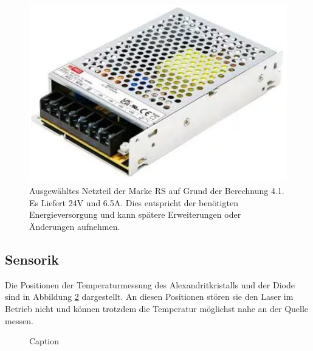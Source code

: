 \begin{figure}[H]
    \centering
    \includegraphics[scale=0.7]{98_images/controller_ps.PNG}
    \caption{Ausgewähltes Netzteil der Marke RS auf Grund der Berechnung 4.1. Es Liefert 24V und 6.5A. Dies entspricht der benötigten Energieversorgung und kann spätere Erweiterungen oder Änderungen aufnehmen.}
    \label{fig:controller_ps_hw}
\end{figure}

\subsection{Sensorik}
Die Positionen der Temperaturmessung des Alexandritkristalls und der Diode sind in Abbildung \ref{fig:temp_measurement_hw} dargestellt. An diesen Positionen stören sie den Laser im Betrieb nicht und können trotzdem die Temperatur möglichst nahe an der Quelle messen.

\begin{figure}
    \centering
    \caption{Caption}
    \label{fig:temp_measurement_hw}
\end{figure}


